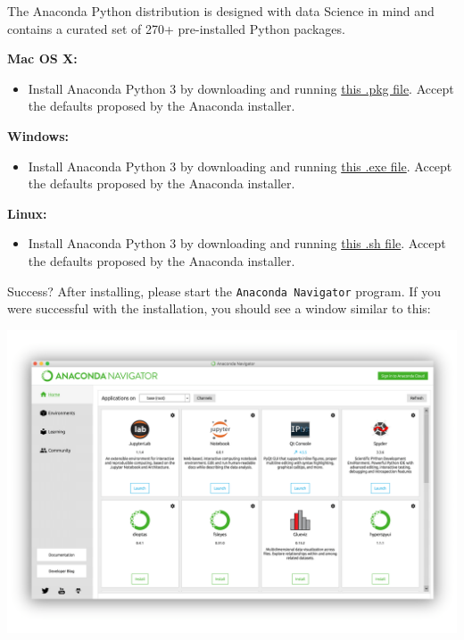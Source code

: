 \documentclass[
]{book}
\providecommand{\tightlist}{%
  \setlength{\itemsep}{0pt}\setlength{\parskip}{0pt}}
\begin{document}
The Anaconda Python distribution is designed with data Science in mind and contains a curated set of 270+ pre-installed Python packages.

\textbf{Mac OS X:}

\begin{itemize}
\tightlist
\item
  Install Anaconda Python 3 by downloading and running \href{https://repo.anaconda.com/archive/Anaconda3-2019.10-MacOSX-x86_64.pkg}{this .pkg file}. Accept the defaults proposed by the Anaconda installer.
\end{itemize}

\textbf{Windows:}

\begin{itemize}
\tightlist
\item
  Install Anaconda Python 3 by downloading and running \href{https://repo.anaconda.com/archive/Anaconda3-2019.10-Windows-x86_64.exe}{this .exe file}. Accept the defaults proposed by the Anaconda installer.
\end{itemize}

\textbf{Linux:}

\begin{itemize}
\tightlist
\item
  Install Anaconda Python 3 by downloading and running \href{https://repo.anaconda.com/archive/Anaconda3-2019.10-Linux-x86_64.sh}{this .sh file}. Accept the defaults proposed by the Anaconda installer.
\end{itemize}

Success? After installing, please start the \texttt{Anaconda\ Navigator} program. If you were successful with the installation, you should see a window similar to this:

\includegraphics{Python/PythonInstall/images/Anaconda_navigator.png}
\end{document}
